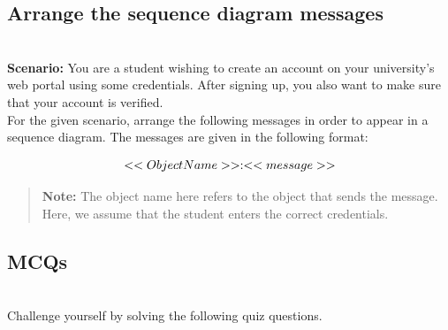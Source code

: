 

\subsection{Arrange the sequence diagram messages}\label{7yHmnfPaWNT9wtKvdAXxa}
\\
\textbf{Scenario:} You are a student wishing to create an account on your university's web portal using some credentials. After signing up, you also want to make sure that your account is verified.
\\
For the given scenario, arrange the following messages in order to appear in a sequence diagram. The messages are given in the following format:

\[
<<ObjectName>>\space:\space <<message>>
\]

\begin{quote}
\textbf{Note:} The object name here refers to the object that sends the message. Here, we assume that the student enters the correct credentials.
\end{quote}


\subsection{MCQs}\label{SieVIhYB2lT88NY28ePjZ}
\\
Challenge yourself by solving the following quiz questions.

